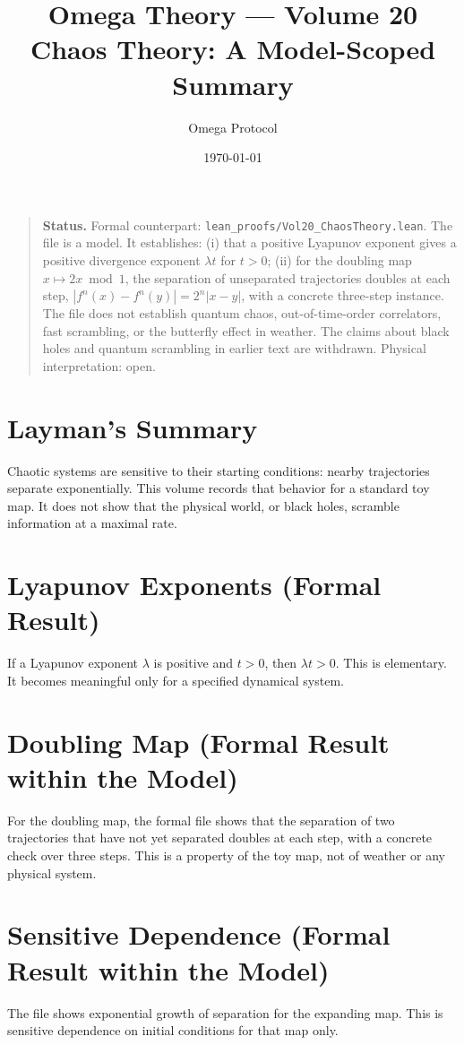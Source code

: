 \documentclass[11pt, a4paper]{article}
\title{Omega Theory --- Volume 20\\\Large Chaos Theory: A Model-Scoped Summary}
\author{Omega Protocol}
\date{\today}
\begin{document}
\maketitle

\begin{quote}
\textbf{Status.} Formal counterpart: \texttt{lean\_proofs/Vol20\_ChaosTheory.lean}. The file is a model. It establishes: (i) that a positive Lyapunov exponent gives a positive divergence exponent $\lambda t$ for $t > 0$; (ii) for the doubling map $x \mapsto 2x \bmod 1$, the separation of unseparated trajectories doubles at each step, $|f^n(x) - f^n(y)| = 2^n |x - y|$, with a concrete three-step instance. The file does not establish quantum chaos, out-of-time-order correlators, fast scrambling, or the butterfly effect in weather. The claims about black holes and quantum scrambling in earlier text are withdrawn. Physical interpretation: open.
\end{quote}

\section*{Layman's Summary}
Chaotic systems are sensitive to their starting conditions: nearby trajectories separate exponentially. This volume records that behavior for a standard toy map. It does not show that the physical world, or black holes, scramble information at a maximal rate.

\section{Lyapunov Exponents (Formal Result)}
If a Lyapunov exponent $\lambda$ is positive and $t > 0$, then $\lambda t > 0$. This is elementary. It becomes meaningful only for a specified dynamical system.

\section{Doubling Map (Formal Result within the Model)}
For the doubling map, the formal file shows that the separation of two trajectories that have not yet separated doubles at each step, with a concrete check over three steps. This is a property of the toy map, not of weather or any physical system.

\section{Sensitive Dependence (Formal Result within the Model)}
The file shows exponential growth of separation for the expanding map. This is sensitive dependence on initial conditions for that map only.
\end{document}
